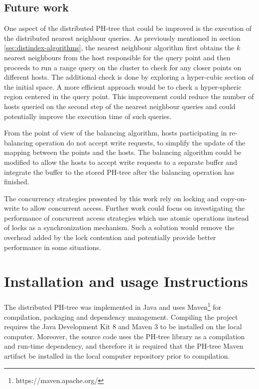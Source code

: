 \documentclass[11pt,a4paper]{globis-book}
\begin{document}
\section{Future work}
\label{sec:conclusions-future-work}

One aspect of the distributed PH-tree that could be improved is the execution of the distributed nearest neighbour queries. As previously mentioned in section \ref{sec:distindex-algorithms}, the nearest neighbour algorithm first obtains the $k$ nearest neighbours from the host responsible for the query point and then proceeds to run a range query on the cluster to check for any closer points on different hosts. The additional check is done by exploring a hyper-cubic section of the initial space. A more efficient approach would be to check a hyper-spheric region centered in the query point. This improvement could reduce the number of hosts queried on the second step of the nearest neighbour queries and could potentially improve the execution time of such queries. 

From the point of view of the balancing algorithm, hosts participating in re-balancing operation do not accept write requests, to simplify the update of the mapping between the points and the hosts. The balancing algorithm could be modified to allow the hosts to accept write requests to a separate buffer and integrate the buffer to the stored PH-tree after the balancing operation has finished.

The concurrency strategies presented by this work rely on locking and copy-on-write to allow concurrent access. Further work could focus on investigating the performance of concurrent access strategies which use atomic operations instead of locks as a synchronization mechanism. Such a solution would remove the overhead added by the lock contention and potentially provide better performance in some situations.

\appendix
\chapter{Installation and usage Instructions}

The distributed PH-tree was implemented in Java and uses Maven\footnote{https://maven.apache.org/} for compilation, packaging and dependency management. Compiling the project requires the Java Development Kit 8 and Maven 3 to be installed on the local computer. Moreover, the source code uses the PH-tree library as a compilation and run-time dependency, and therefore it is required that the PH-tree Maven artifact be installed in the local computer repository prior to compilation. 
\end{document}
